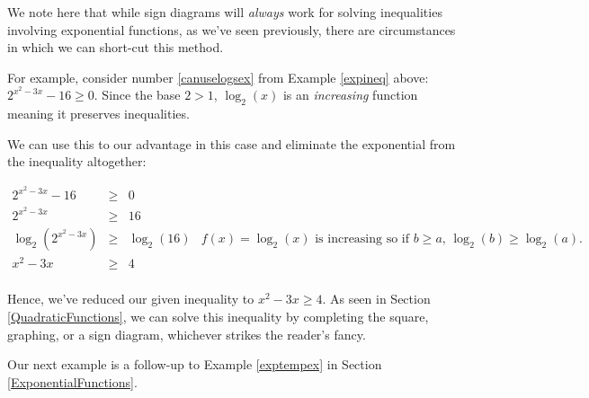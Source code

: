 \documentclass{ximera}
\begin{document}
We note here that while sign diagrams will \textit{always} work for solving inequalities involving exponential functions, as we've seen previously, there are circumstances in which we can short-cut this method. 

\smallskip

For example, consider number \ref{canuselogsex} from Example \ref{expineq} above:  $2^{x^2-3x} - 16 \geq 0$.  Since the base $2>1$, $\log_{2}(x)$ is an \textit{increasing} function meaning it preserves inequalities.

\smallskip

We can use this to our advantage in this case and eliminate the exponential from the inequality altogether:

\[ \begin{array}{rclr}

2^{x^2-3x} - 16 &  \geq &  0 &  \\

2^{x^2-3x}  & \geq & 16 & \\

\log_{2}\left(2^{x^2-3x} \right) & \geq & \log_{2}(16) & \text{$f(x) = \log_{2}(x)$ is increasing so if $b \geq a$, $\log_{2}(b) \geq \log_{2}(a)$. } \\

x^2 - 3x & \geq & 4 &\\ \end{array} \]

Hence, we've  reduced our given inequality to $x^2-3x \geq 4$.  As seen in Section \ref{QuadraticFunctions}, we can solve this inequality by completing the square, graphing, or a sign diagram, whichever strikes the reader's fancy.

\smallskip

Our next example is a follow-up to Example \ref{exptempex} in Section \ref{ExponentialFunctions}.  

\smallskip
\end{document}
